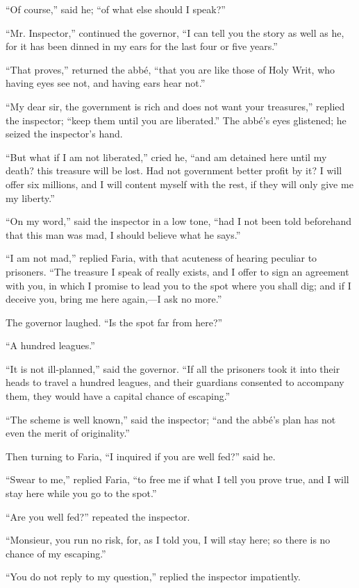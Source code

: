 “Of course,” said he; “of what else should I speak?”

“Mr. Inspector,” continued the governor, “I can tell you the story as
well as he, for it has been dinned in my ears for the last four or five
years.”

“That proves,” returned the abbé, “that you are like those of Holy
Writ, who having eyes see not, and having ears hear not.”

“My dear sir, the government is rich and does not want your treasures,”
replied the inspector; “keep them until you are liberated.” The abbé’s
eyes glistened; he seized the inspector’s hand.

“But what if I am not liberated,” cried he, “and am detained here until
my death? this treasure will be lost. Had not government better profit
by it? I will offer six millions, and I will content myself with the
rest, if they will only give me my liberty.”

“On my word,” said the inspector in a low tone, “had I not been told
beforehand that this man was mad, I should believe what he says.”

“I am not mad,” replied Faria, with that acuteness of hearing peculiar
to prisoners. “The treasure I speak of really exists, and I offer to
sign an agreement with you, in which I promise to lead you to the spot
where you shall dig; and if I deceive you, bring me here again,—I ask
no more.”

The governor laughed. “Is the spot far from here?”

“A hundred leagues.”

“It is not ill-planned,” said the governor. “If all the prisoners took
it into their heads to travel a hundred leagues, and their guardians
consented to accompany them, they would have a capital chance of
escaping.”

“The scheme is well known,” said the inspector; “and the abbé’s plan
has not even the merit of originality.”

Then turning to Faria, “I inquired if you are well fed?” said he.

“Swear to me,” replied Faria, “to free me if what I tell you prove
true, and I will stay here while you go to the spot.”

“Are you well fed?” repeated the inspector.

“Monsieur, you run no risk, for, as I told you, I will stay here; so
there is no chance of my escaping.”

“You do not reply to my question,” replied the inspector impatiently.

